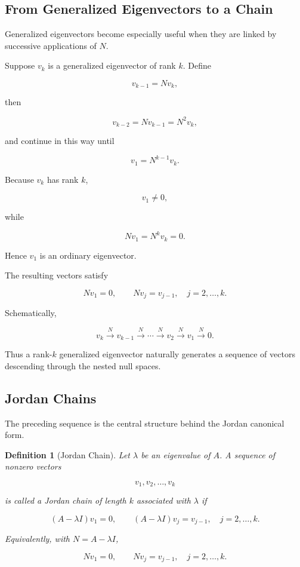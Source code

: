 \documentclass[11pt]{article}
\newtheorem{definition}[theorem]{Definition}
\begin{document}
\subsection{From Generalized Eigenvectors to a Chain}

Generalized eigenvectors become especially useful when they are linked
by successive applications of \(N\).

Suppose \(v_k\) is a generalized eigenvector of rank \(k\).  Define

\[
v_{k-1}=Nv_k,
\]

then

\[
v_{k-2}=Nv_{k-1}=N^2v_k,
\]

and continue in this way until

\[
v_1=N^{k-1}v_k.
\]

Because \(v_k\) has rank \(k\),

\[
v_1\neq0,
\]

while

\[
Nv_1=N^kv_k=0.
\]

Hence \(v_1\) is an ordinary eigenvector.

The resulting vectors satisfy

\[
\boxed{
Nv_1=0,
\qquad
Nv_j=v_{j-1},
\quad
j=2,\ldots,k.
}
\]

Schematically,

\[
\boxed{
v_k
\xrightarrow{\,N\,}
v_{k-1}
\xrightarrow{\,N\,}
\cdots
\xrightarrow{\,N\,}
v_2
\xrightarrow{\,N\,}
v_1
\xrightarrow{\,N\,}
0.
}
\]

Thus a rank-\(k\) generalized eigenvector naturally generates a
sequence of vectors descending through the nested null spaces.


\subsection{Jordan Chains}

The preceding sequence is the central structure behind the Jordan
canonical form.

\begin{definition}[Jordan Chain]
Let \(\lambda\) be an eigenvalue of \(A\).  A sequence of nonzero
vectors

\[
v_1,v_2,\ldots,v_k
\]

is called a \emph{Jordan chain of length \(k\)} associated with
\(\lambda\) if

\[
\boxed{
(A-\lambda I)v_1=0,
\qquad
(A-\lambda I)v_j=v_{j-1},
\quad
j=2,\ldots,k.
}
\]

Equivalently, with \(N=A-\lambda I\),

\[
Nv_1=0,
\qquad
Nv_j=v_{j-1},
\quad
j=2,\ldots,k.
\]
\end{definition}
\end{document}
